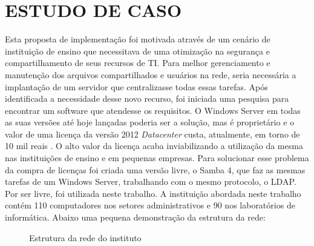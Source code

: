 \chapter{ESTUDO DE CASO}

Esta proposta de implementação foi motivada através de um cenário de instituição de ensino que necessitava de uma otimização na segurança e compartilhamento de seus recursos de TI. Para melhor gerenciamento e manutenção dos arquivos compartilhados e usuários na rede, seria necessária a implantação de um servidor que centralizasse todas essas tarefas.
Após identificada a necessidade desse novo recurso, foi iniciada uma pesquisa para encontrar um software que atendesse os requisitos. O Windows Server em todas as suas versões até hoje lançadas poderia ser a solução, mas é proprietário e o valor de uma licença da versão 2012 \textit{Datacenter} custa, atualmente, em torno de 10 mil reais \cite{SERVER}. O alto valor da licença acaba inviabilizando a utilização da mesma nas instituições  de ensino e em pequenas empresas. 
Para solucionar esse problema da compra de licenças foi criada uma versão livre, o Samba 4, que faz as mesmas tarefas de um Windows Server, trabalhando com o mesmo protocolo, o LDAP. Por ser livre, foi utilizada neste trabalho.
A instituição abordada neste trabalho contém 110 computadores nos setores administrativos e 90 nos laboratórios de informática. Abaixo uma pequena demonstração da estrutura da rede:

\begin{figure}[ht]
   	\centering
   	\caption{Estrutura da rede do instituto}
    \label{rede}
\end{figure}
          				
